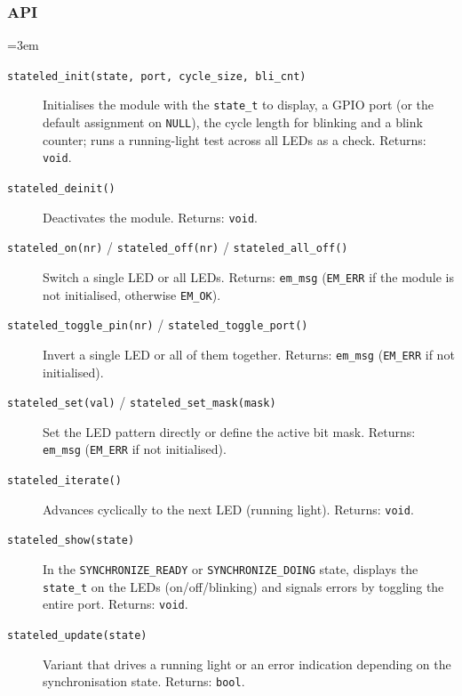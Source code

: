 \subsubsection*{API}
{\sloppy\emergencystretch=3em
\begin{description}
\item[\texttt{stateled\_init(state, port, cycle\_size, bli\_cnt)}]
  Initialises the module with the \verb|state_t| to display, a GPIO port (or
  the default assignment on \verb|NULL|), the cycle length for blinking and a
  blink counter; runs a running-light test across all LEDs as a check.
  Returns: \verb|void|.
\item[\texttt{stateled\_deinit()}] Deactivates the module. Returns: \verb|void|.
\item[\texttt{stateled\_on(nr)} / \texttt{stateled\_off(nr)} /
  \texttt{stateled\_all\_off()}] Switch a single LED or all LEDs. Returns:
  \verb|em_msg| (\verb|EM_ERR| if the module is not initialised, otherwise
  \verb|EM_OK|).
\item[\texttt{stateled\_toggle\_pin(nr)} / \texttt{stateled\_toggle\_port()}]
  Invert a single LED or all of them together. Returns: \verb|em_msg|
  (\verb|EM_ERR| if not initialised).
\item[\texttt{stateled\_set(val)} / \texttt{stateled\_set\_mask(mask)}] Set the
  LED pattern directly or define the active bit mask. Returns: \verb|em_msg|
  (\verb|EM_ERR| if not initialised).
\item[\texttt{stateled\_iterate()}] Advances cyclically to the next LED
  (running light). Returns: \verb|void|.
\item[\texttt{stateled\_show(state)}] In the \verb|SYNCHRONIZE_READY| or
  \verb|SYNCHRONIZE_DOING| state, displays the \verb|state_t| on the LEDs
  (on/off/blinking) and signals errors by toggling the entire port. Returns:
  \verb|void|.
\item[\texttt{stateled\_update(state)}] Variant that drives a running light or
  an error indication depending on the synchronisation state. Returns:
  \verb|bool|.
\end{description}
\par}
